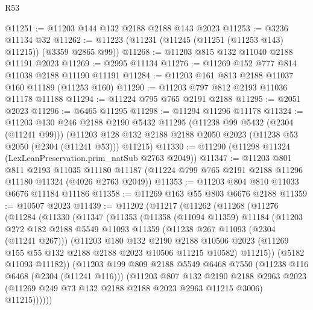 \begin{lexlean}{R53}
\begin{coremodule}
@11251 := @11203 @144 @132 @2188 @2188 @143 @2023
@11253 := @3236 @11134 @32
@11262 := @11223 (@11231 (@11245 (@11251 (@11253 @143) @11215)) (@3359 @2865 @99))
@11268 := @11203 @815 @132 @11040 @2188 @11191 @2023
@11269 := @2995 @11134
@11276 := @11269 @152 @777 @814 @11038 @2188 @11190 @11191
@11284 := @11203 @161 @813 @2188 @11037 @160 @11189 (@11253 @160)
@11290 := @11203 @797 @812 @2193 @11036 @11178 @11188
@11294 := @11224 @795 @765 @2191 @2188
@11295 := @2051 @2023
@11296 := @6465 @11295
@11298 := @11294 @11296 @11178
@11324 := @11203
    @130
    @246
    @2188
    @2190
    @5432
    @11295
    (@11238 @99 @5432 (@2304 (@11241 @99)))
    (@11203 @128 @132 @2188 @2188 @2050 @2023 (@11238 @53 @2050 (@2304 (@11241 @53))) @11215)
@11330 := @11290 (@11298 @11324 (LexLeanPreservation.prim_natSub @2763 @2049))
@11347 := @11203
    @801
    @811
    @2193
    @11035
    @11180
    @11187
    (@11224 @799 @765 @2191 @2188 @11296 @11180 @11324 (@4026 @2763 @2049))
@11353 := @11203 @804 @810 @11033 @6676 @11184 @11186
@11358 := @11269 @163 @55 @803 @6676 @2188
@11359 := @10507 @2023
@11439 := @11202
    (@11217
      (@11262
        (@11268
          (@11276
            (@11284
              (@11330
                (@11347
                  (@11353
                    (@11358
                      (@11094 @11359)
                      @11184
                      (@11203
                        @272
                        @182
                        @2188
                        @5549
                        @11093
                        @11359
                        (@11238 @267 @11093 (@2304 (@11241 @267)))
                        (@11203
                          @180
                          @132
                          @2190
                          @2188
                          @10506
                          @2023
                          (@11269 @155 @55 @132 @2188 @2188 @2023 @10506 @11215 @10582)
                          @11215))
                      (@5182 @11093 @11182))
                    (@11203
                      @199
                      @809
                      @2188
                      @5549
                      @6468
                      @7550
                      (@11238 @116 @6468 (@2304 (@11241 @116)))
                      (@11203
                        @807
                        @132
                        @2190
                        @2188
                        @2963
                        @2023
                        (@11269 @249 @73 @132 @2188 @2188 @2023 @2963 @11215 @3006)
                        @11215))))))

\end{coremodule}
\end{lexlean}
